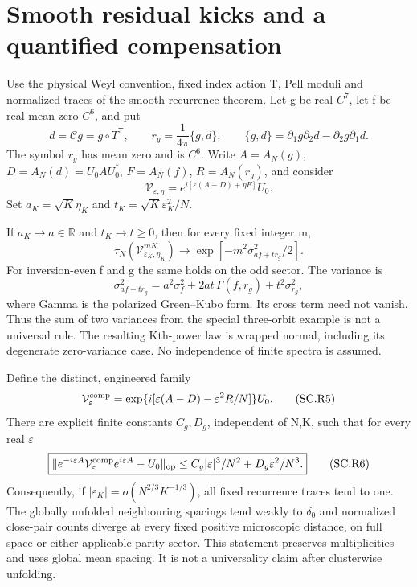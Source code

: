 \section{Smooth residual kicks and a quantified compensation}\label{sec:smooth_residual}
Use the physical Weyl convention, fixed index action T, Pell moduli and normalized traces of the \hyperref[sec:smooth]{smooth recurrence theorem}. Let g be real \(C^7\), let f be real mean-zero \(C^6\), and put \[
 d=\mathcal Cg=g\circ T^{\mathsf T},\qquad
 r_g=\frac1{4\pi}\{g,d\},\qquad
 \{g,d\}=\partial_1g\partial_2d-\partial_2g\partial_1d.          \tag{SC.R1}
\] The symbol \(r_{g}\) has mean zero and is \(C^6\). Write \(A=A_N(g)\), \(D=A_N(d)=U_0AU_0^*\), \(F=A_N(f)\), \(R=A_N(r_g)\), and consider \[
 \mathcal V_{\varepsilon,\eta}
       =e^{i[\varepsilon(A-D)+\eta F]}U_0.                    \tag{SC.R2}
\] Set \(a_K=\sqrt K\eta_K\) and \(t_K=\sqrt K\varepsilon_K^2/N\).

\begin{theorem}\label{pass1:smooth_residual-1} If \(a_K\to a\in\mathbb R\) and \(t_K\to t\geq0\), then for every fixed integer m, \[
 \boxed{\tau_N(\mathcal V_{\varepsilon_K,\eta_K}^{mK})
      \longrightarrow\exp[-m^2\sigma_{af+tr_g}^2/2].}         \tag{SC.R3}
\] For inversion-even f and g the same holds on the odd sector. The variance is \[
 \sigma_{af+tr_g}^2=a^2\sigma_f^2+2at\,\Gamma(f,r_g)
                         +t^2\sigma_{r_g}^2,                 \tag{SC.R4}
\] where Gamma is the polarized Green--Kubo form. Its cross term need not vanish. Thus the sum of two variances from the special three-orbit example is not a universal rule. The resulting Kth-power law is wrapped normal, including its degenerate zero-variance case. No independence of finite spectra is assumed.
\end{theorem}

\begin{theorem}\label{pass1:smooth_residual-2} Define the distinct, engineered family \[
 \mathcal V^{\rm comp}_\varepsilon
   =\exp\{i[\varepsilon(A-D)-\varepsilon^2 R/N]\}U_0.          \tag{SC.R5}
\] There are explicit finite constants \(C_g,D_g\), independent of N,K, such that for every real \(\varepsilon\) \[
 \boxed{\|e^{-i\varepsilon A}\mathcal V^{\rm comp}_\varepsilon
             e^{i\varepsilon A}-U_0\|_{\rm op}
        \leq C_g|\varepsilon|^3/N^2+D_g\varepsilon^2/N^3.}     \tag{SC.R6}
\] Consequently, if \(|\varepsilon_K|=o(N^{2/3}K^{-1/3})\), all fixed recurrence traces tend to one. The globally unfolded neighbouring spacings tend weakly to \(\delta_{0}\) and normalized close-pair counts diverge at every fixed positive microscopic distance, on full space or either applicable parity sector. This statement preserves multiplicities and uses global mean spacing. It is not a universality claim after clusterwise unfolding.
\end{theorem}


